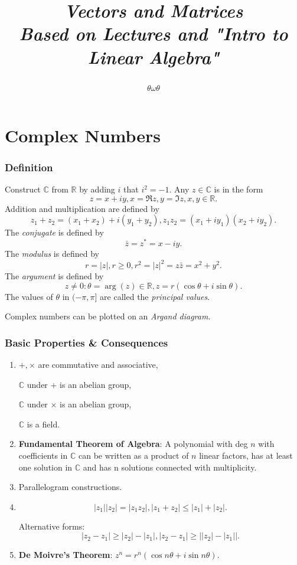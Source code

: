 \documentclass[10pt]{article}
\title{\begin{center}{\Huge \textit{Vectors and Matrices}}\\{{\itshape Based on Lectures and "Intro to Linear Algebra"}}\end{center}}
\author{$\theta\omega\theta$}
\affiliation{
Not in University of Cambridge\\
skipped some talks irrelevant to contents\\
}
\def\le{\leqslant}
\def\ge{\geqslant}
\begin{document}
	\maketitle
	\flushbottom
	\newpage
	\pagestyle{fancynotes}
	\part{Complex Numbers}
    \section{Definition}
    \begin{definition}
        Construct $\mathbb{C} $ from $ \mathbb{R}  $ by adding $i$ that $i^2 = -1$. Any $z\in \mathbb{C}$ is in the form
        \[
            z = x+iy, x = \Re z, y= \Im z, x,y\in \mathbb{R} . 
        \] 
        Addition and multiplication are defined by
        \[
            z_1+z_2 = (x_1+x_2) + i(y_1+y_2), z_1z_2 = (x_1+iy_1)(x_2+iy_2)
        .\]
        The \textit{conjugate} is defined by
        \[
            \bar{z} = z^* = x-iy
        .\]
        The \textit{modulus} is defined by
        \[
            r = |z|, r\ge 0, r^2=|z|^2=z\bar{z}=x^2+y^2
        .\]
        The \textit{argument} is defined by
        \[
            z\neq 0: \theta=\arg(z)\in \mathbb{R}, z=r(\cos \theta+i\sin \theta)
        .\]
        The values of $ \theta $ in $ (-\pi, \pi] $ are called the \textit{principal values}.

        Complex numbers can be plotted on an \textit{Argand diagram}.
    \end{definition}
    \section{Basic Properties \& Consequences}
    \begin{enumerate}[(1)]
        \item $ +, \times $ are commutative and associative,
        
            $ \mathbb{C} $ under $+$ is an abelian group,
            
            $ \mathbb{C} $ under $\times$ is an abelian group,

            $ \mathbb{C} $ is a field.
        \item \textbf{Fundamental Theorem of Algebra}: A polynomial with deg $n$ with coefficients in $ \mathbb{C}  $ can be written as a product of $n$ linear factors, has at least one solution in $ \mathbb{C}  $ and has n solutions connected with multiplicity.
        \item Parallelogram constructions.
        \item \[
            \left| z_1 \right| \left| z_2 \right| = \left| z_1z_2 \right|, \left| z_1+z_2 \right| \le \left| z_1 \right| +\left| z_2 \right|
        .\]

        Alternative forms:
        \[
            \left| z_2-z_1 \right| \ge \left| z_2 \right| -\left| z_1 \right|, \left| z_2-z_1 \right| \ge \left| |z_2|-|z_1| \right| 
        .\]
        \item \textbf{De Moivre's Theorem}: $ z^n = r^n(\cos n\theta+i\sin n\theta) $.
    \end{enumerate}
\end{document}
